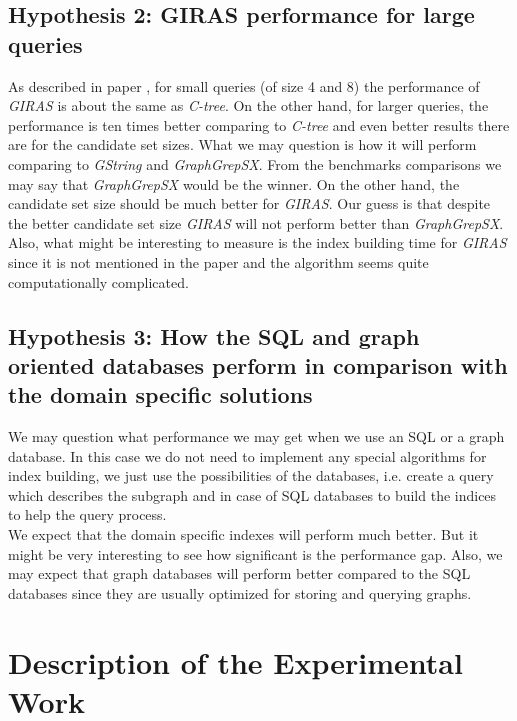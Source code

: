 \subsection{Hypothesis 2: GIRAS performance for large queries}

As described in paper \cite{GIRAS}, for small queries (of size 4 and 8) the performance of \textit{GIRAS} is about the same as \textit{C-tree}. On the other hand, for larger queries, the performance is ten times better comparing to \textit{C-tree} and even better results there are for the candidate set sizes. What we may question is how it will perform comparing to \textit{GString} and \textit{GraphGrepSX}. From the benchmarks comparisons we may say that \textit{GraphGrepSX} would be the winner. On the other hand, the candidate set size should be much better for \textit{GIRAS}. Our guess is that despite the better candidate set size \textit{GIRAS} will not perform better than \textit{GraphGrepSX}.\\

Also, what might be interesting to measure is the index building time for \textit{GIRAS} since it is not mentioned in the paper \cite{GIRAS} and the algorithm seems quite computationally complicated.

\subsection{Hypothesis 3: How the SQL and graph oriented databases perform in comparison with the domain specific solutions}

We may question what performance we may get when we use an SQL or a graph database. In this case we do not need to implement any special algorithms for index building, we just use the possibilities of the databases, i.e. create a query which describes the subgraph and in case of SQL databases to build the indices to help the query process.\\

We expect that the domain specific indexes will perform much better. But it might be very interesting to see how significant is the performance gap. Also, we may expect that graph databases will perform better compared to the SQL databases since they are usually optimized for storing and querying graphs.

\section{Description of the Experimental Work}

